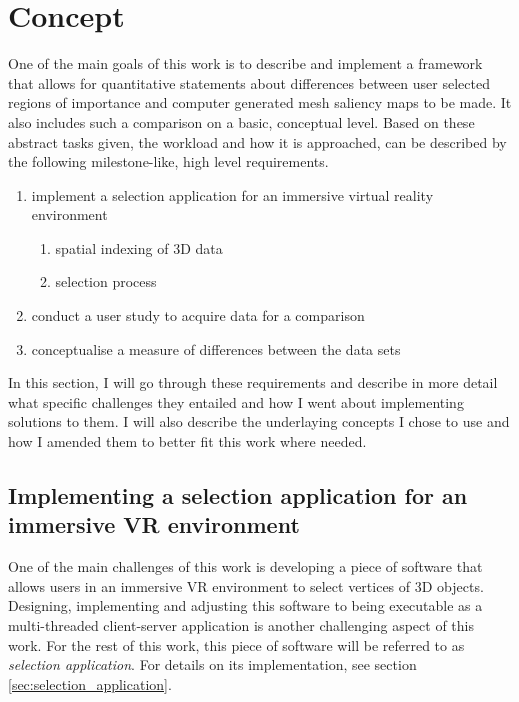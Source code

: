 \chapter{Concept}
\label{sec:concept}

One of the main goals of this work is to describe and implement a framework that allows for quantitative statements about differences between user selected regions of importance and computer generated mesh saliency maps to be made. It also includes such a comparison on a basic, conceptual level. Based on these abstract tasks given, the workload and how it is approached, can be described by the following milestone-like, high level requirements.

\begin{enumerate}
	\item implement a selection application for an immersive virtual reality environment
	\begin{enumerate}
		\item spatial indexing of 3D data
		\item selection process
	\end{enumerate}
	\item conduct a user study to acquire data for a comparison
	\item conceptualise a measure of differences between the data sets
\end{enumerate}

In this section, I will go through these requirements and describe in more detail what specific challenges they entailed and how I went about implementing solutions to them. I will also describe the underlaying concepts I chose to use and how I amended them to better fit this work where needed.

	\section {Implementing a selection application for an immersive VR environment}
	\label{sec:implementing_selection_application_v2c}
One of the main challenges of this work is developing a piece of software that allows users in an immersive VR environment to select vertices of 3D objects. Designing, implementing and adjusting this software to being executable as a multi-threaded client-server application is another challenging aspect of this work. For the rest of this work, this piece of software will be referred to as \textit{selection application}. For details on its implementation, see section \ref{sec:selection_application}.

